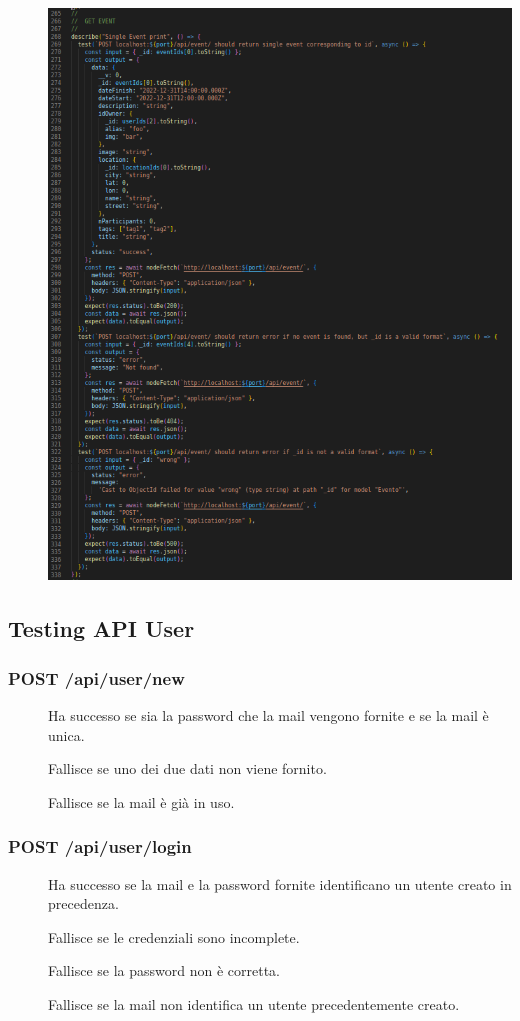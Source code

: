 \documentclass{article}
\begin{document}
\begin{description}
    \item[] \begin{center}
            \includegraphics[scale=0.7]{getUserTest.png}
        \end{center}
\end{description}
\clearpage
\subsection{Testing API User}
\subsubsection{POST /api/user/new}
\begin{description}
    \item[] Ha successo se sia la password che la mail vengono fornite e se la mail è unica.
    \item[] Fallisce se uno dei due dati non viene fornito.
    \item[] Fallisce se la mail è già in uso.
\end{description}
\subsubsection{POST /api/user/login}
\begin{description}
    \item[] Ha successo se la mail e la password fornite identificano un utente creato in precedenza.
    \item[] Fallisce se le credenziali sono incomplete.
    \item[] Fallisce se la password non è corretta.
    \item[] Fallisce se la mail non identifica un utente precedentemente creato.
\end{description}
\end{document}
